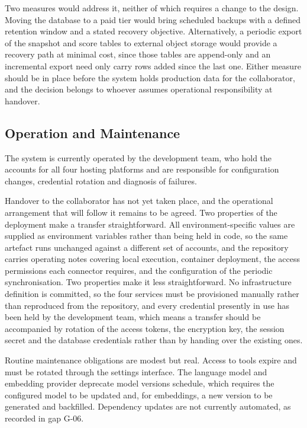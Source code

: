 Two measures would address it, neither of which requires a change to the design.
Moving the database to a paid tier would bring scheduled backups with a defined
retention window and a stated recovery objective. Alternatively, a periodic
export of the snapshot and score tables to external object storage would provide
a recovery path at minimal cost, since those tables are append-only and an
incremental export need only carry rows added since the last one. Either measure
should be in place before the system holds production data for the collaborator,
and the decision belongs to whoever assumes operational responsibility at
handover.

\subsection{Operation and Maintenance}
\label{subsec:operation}

The system is currently operated by the development team, who hold the accounts
for all four hosting platforms and are responsible for configuration changes,
credential rotation and diagnosis of failures.

Handover to the collaborator has not yet taken place, and the operational
arrangement that will follow it remains to be agreed. Two properties of the
deployment make a transfer straightforward. All environment-specific values are
supplied as environment variables rather than being held in code, so the same
artefact runs unchanged against a different set of accounts, and the repository
carries operating notes covering local execution, container deployment, the
access permissions each connector requires, and the configuration of the
periodic synchronisation. Two properties make it less straightforward. No
infrastructure definition is committed, so the four services must be provisioned
manually rather than reproduced from the repository, and every credential
presently in use has been held by the development team, which means a transfer
should be accompanied by rotation of the access tokens, the encryption key, the
session secret and the database credentials rather than by handing over the
existing ones.

Routine maintenance obligations are modest but real. Access to
tools expire and must be rotated through the settings interface. The
language model and embedding provider deprecate model versions
schedule, which requires the configured model to be updated and, for embeddings,
a new version to be generated and backfilled. Dependency updates are not
currently automated, as recorded in gap G-06.

